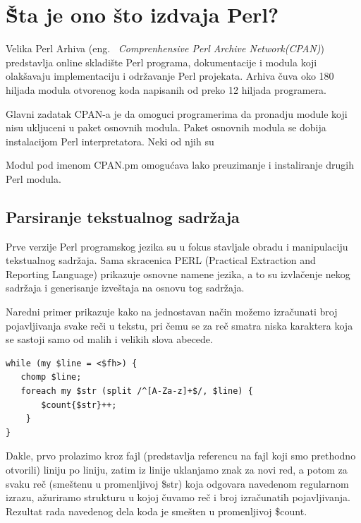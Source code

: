 \documentclass[a4paper]{article}
\begin{document}
\section{\v Šta je ono što izdvaja Perl?}

Velika Perl Arhiva\cite{cpan} (eng. ~{\em Comprenhensive Perl Archive Network(CPAN)}) 
 predstavlja online skladište Perl programa, dokumentacije i modula koji olakšavaju implementaciju i održavanje Perl projekata. Arhiva čuva oko 180 hiljada modula otvorenog koda napisanih od preko 12 hiljada 
 programera.

Glavni zadatak CPAN-a je da omoguci programerima da pronadju module koji nisu ukljuceni u paket osnovnih modula. Paket osnovnih modula se dobija instalacijom Perl interpretatora. Neki od njih su 

Modul pod imenom CPAN.pm omogućava lako preuzimanje i instaliranje drugih Perl modula. 


\subsection{Parsiranje tekstualnog sadržaja}

Prve verzije Perl programskog jezika su u fokus stavljale obradu i manipulaciju tekstualnog sadržaja. Sama skracenica PERL (Practical Extraction and Reporting Language) prikazuje osnovne namene jezika, a to su izvlačenje nekog sadržaja i generisanje izveštaja na osnovu tog sadržaja.

Naredni primer prikazuje kako na jednostavan način možemo izračunati broj pojavljivanja svake reči u tekstu, pri čemu se za reč smatra niska karaktera koja se sastoji samo od malih i velikih slova abecede.

\begin{lstlisting}[label=simple]
while (my $line = <$fh>) {
   chomp $line;
   foreach my $str (split /^[A-Za-z]+$/, $line) {
       $count{$str}++;
    } 
}
\end{lstlisting}


Dakle, prvo prolazimo kroz fajl (predstavlja referencu na fajl koji smo 
prethodno otvorili) liniju po liniju, zatim iz linije uklanjamo znak za novi red, a potom za svaku reč (smeštenu u promenljivoj \$str) koja odgovara navedenom regularnom izrazu, ažuriramo strukturu u kojoj čuvamo reč i broj izračunatih pojavljivanja. Rezultat rada navedenog 
dela koda je smešten u promenljivoj \$count. \cite{cooksnd}
\end{document}
